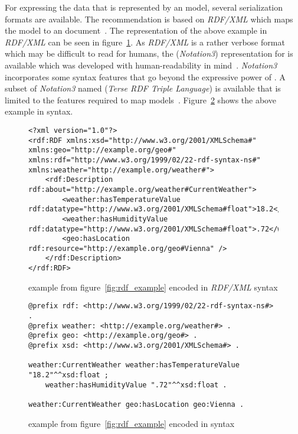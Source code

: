 For expressing the data that is represented by an  model, several serialization formats are available. The  recommendation is based on \emph{RDF/XML} which maps the  model to an  document~\cite{RDF_XML}. The representation of the above example in \emph{RDF/XML} can be seen in figure~\ref{fig:rdfxml_example}. As \emph{RDF/XML} is a rather verbose format which may be difficult to read for humans, the  (\emph{Notation3}) representation for  is available which was developed with human-readability in mind~\cite{Notation3}. \emph{Notation3} incorporates some syntax features that go beyond the expressive power of . A subset of \emph{Notation3} named  (\emph{Terse RDF Triple Language}) is available that is limited to the features required to map  models~\cite{Turtle}. Figure~\ref{fig:turtle_example} shows the above example in  syntax.

\begin{figure} %
\begin{lstlisting}
<?xml version="1.0"?>
<rdf:RDF xmlns:xsd="http://www.w3.org/2001/XMLSchema#" xmlns:geo="http://example.org/geo#" xmlns:rdf="http://www.w3.org/1999/02/22-rdf-syntax-ns#" xmlns:weather="http://example.org/weather#">
	<rdf:Description rdf:about="http://example.org/weather#CurrentWeather">
		<weather:hasTemperatureValue rdf:datatype="http://www.w3.org/2001/XMLSchema#float">18.2</weather:hasTemperatureValue>
		<weather:hasHumidityValue rdf:datatype="http://www.w3.org/2001/XMLSchema#float">.72</weather:hasHumidityValue>
		<geo:hasLocation rdf:resource="http://example.org/geo#Vienna" />
	</rdf:Description>
</rdf:RDF>
\end{lstlisting}
\caption{ example from figure~\ref{fig:rdf_example} encoded in \emph{RDF/XML} syntax}
\label{fig:rdfxml_example}
\end{figure}

\begin{figure}
\begin{lstlisting}
@prefix rdf: <http://www.w3.org/1999/02/22-rdf-syntax-ns#> .
@prefix weather: <http://example.org/weather#> .
@prefix geo: <http://example.org/geo#> .
@prefix xsd: <http://www.w3.org/2001/XMLSchema#> .

weather:CurrentWeather weather:hasTemperatureValue "18.2"^^xsd:float ;
    weather:hasHumidityValue ".72"^^xsd:float .

weather:CurrentWeather geo:hasLocation geo:Vienna .
\end{lstlisting}
\caption{ example from figure~\ref{fig:rdf_example} encoded in  syntax}
\label{fig:turtle_example}
\end{figure}


